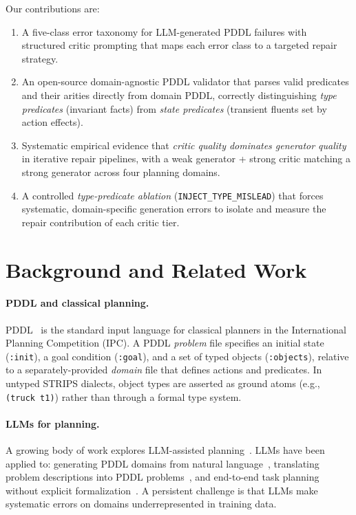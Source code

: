 \documentclass{article}
\begin{document}
Our contributions are:
\begin{enumerate}[leftmargin=1.5em]
  \item A five-class error taxonomy for LLM-generated PDDL failures with structured
        critic prompting that maps each error class to a targeted repair strategy.
  \item An open-source domain-agnostic PDDL validator that parses valid predicates
        and their arities directly from domain PDDL, correctly distinguishing
        \emph{type predicates} (invariant facts) from \emph{state predicates}
        (transient fluents set by action effects).
  \item Systematic empirical evidence that \emph{critic quality dominates generator
        quality} in iterative repair pipelines, with a weak generator + strong critic
        matching a strong generator across four planning domains.
  \item A controlled \emph{type-predicate ablation} (\texttt{INJECT\_TYPE\_MISLEAD})
        that forces systematic, domain-specific generation errors to isolate and measure
        the repair contribution of each critic tier.
\end{enumerate}

\section{Background and Related Work}
\label{sec:background}

\paragraph{PDDL and classical planning.}
PDDL~\cite{mcdermott1998pddl} is the standard input language for classical planners
in the International Planning Competition (IPC).  A PDDL \emph{problem} file specifies
an initial state (\texttt{:init}), a goal condition (\texttt{:goal}), and a set of
typed objects (\texttt{:objects}), relative to a separately-provided \emph{domain}
file that defines actions and predicates.  In untyped STRIPS dialects, object types
are asserted as ground atoms (e.g., \texttt{(truck t1)}) rather than through a
formal type system.

\paragraph{LLMs for planning.}
A growing body of work explores LLM-assisted planning~\cite{valmeekam2022large,
silver2022pddl,liu2023llm+p}.  LLMs have been applied to: generating PDDL
domains from natural language~\cite{guo2023pddl}, translating problem descriptions
into PDDL problems~\cite{xie2023translating}, and end-to-end task planning without
explicit formalization~\cite{ahn2022saycan}.  A persistent challenge is that LLMs
make systematic errors on domains underrepresented in training data.
\end{document}
